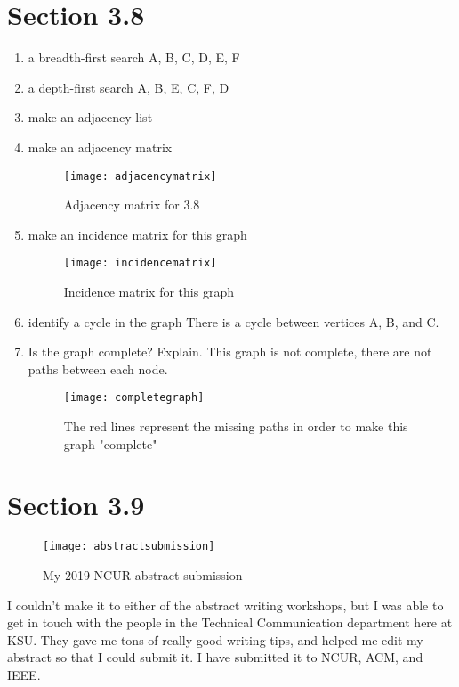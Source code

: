\documentclass[11pt]{article}
\begin{document}
\section*{Section 3.8}
\begin{enumerate}
    \item a breadth-first search \newline
    A, B, C, D, E, F
    
    \item a depth-first search \newline
    A, B, E, C, F, D
    
    \item make an adjacency list
    
    \item make an adjacency matrix
    \begin{figure}
        \centering
        \texttt{[image: adjacencymatrix]}
        \caption{Adjacency matrix for 3.8}
        \label{fig:my_label}
    \end{figure}
    \item make an incidence matrix for this graph
    \begin{figure}
        \centering
        \texttt{[image: incidencematrix]}
        \caption{Incidence matrix for this graph}
        \label{fig:my_label}
    \end{figure}
    
    \item identify a cycle in the graph \newline
    There is a cycle between vertices A, B, and C.
    
    \item Is the graph complete? Explain. \newline
    This graph is not complete, there are not paths between each node.
    
    \begin{figure}
        \centering
        \texttt{[image: completegraph]}
        \caption{The red lines represent the missing paths in order to make this graph "complete"}
        \label{fig:my_label}
    \end{figure}
\end{enumerate}

\section*{Section 3.9}
\begin{figure}
    \centering
    \texttt{[image: abstractsubmission]}
    \caption{My 2019 NCUR abstract submission}
    \label{fig:my_label}
\end{figure}

I couldn't make it to either of the abstract writing workshops, but I was able to get in touch with the people in the Technical Communication department here at KSU. They gave me tons of really good writing tips, and helped me edit my abstract so that I could submit it. I have submitted it to NCUR, ACM, and IEEE. 
\end{document}
